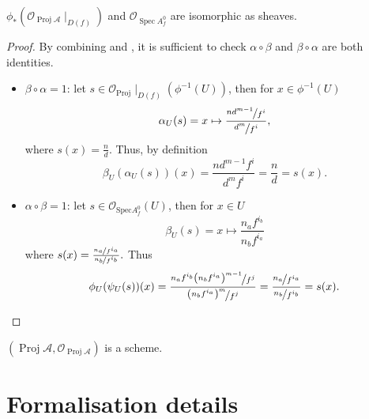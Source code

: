 \documentclass[a4paper,UKenglish,cleveref, autoref, thm-restate]{lipics-v2021}
\begin{document}
\begin{theorem}\label{thm:iso-sheaf}
    $\phi_*(\mathcal{O}_{\operatorname{Proj}\mathcal{A}}\!\mid_{D(f)})$ and $\mathcal{O}_{\operatorname{Spec}A^0_f}$ are isomorphic as sheaves.
\end{theorem}
\begin{proof}
    By combining  and , it is sufficient to check $\alpha \circ \beta$ and $\beta \circ \alpha$ are both identities. 
    \begin{itemize}
        \item $\beta\circ\alpha=1$: let $s\in\mathcal O_{\mathrm{Proj}}\!\mid_{D(f)}(\phi^{-1}(U))$, then for $x\in \phi^{-1}(U)$
        $$
        \alpha_U(s)=x\mapsto \frac{\nicefrac{nd^{m-1}}{f^i}}{\nicefrac{d^m}{f^i}},
        $$
        where $s(x)=\frac n d$.
        Thus, by definition
        $$
        \beta_U(\alpha_U(s))(x)=\frac{nd^{m-1}f^i}{d^mf^i}=\frac n d=s(x).
        $$
        \item $\alpha\circ\beta=1$: let $s\in\mathcal O_{\mathrm{Spec}A^0_f}(U)$, then for $x\in U$
        $$
        \beta_U(s)=x\mapsto \frac{n_af^{i_b}}{n_bf^{i_a}}
        $$
        where 
        $s(x)=\frac{\nicefrac{n_a}{f^{i_a}}}{\nicefrac{n_b}{f^{i_b}}}.$ Thus
        $$
        \phi_U(\psi_U(s))(x)=\frac{\nicefrac{n_af^{i_b}\left(n_bf^{i_a}\right)^{m-1}}{f^{j}}}{\nicefrac{\left(n_bf^{i_a}\right)^m}{f^{j}}}=\frac{\nicefrac{n_a}{f^{i_a}}}{\nicefrac{n_b}{f^{i_b}}}=s(x).
        $$
    \end{itemize}
\end{proof}

\begin{corollary}\label{thm:proj-scheme}
    $(\operatorname{Proj}\mathcal{A}, \mathcal{O}_{\operatorname{Proj}\mathcal{A}})$ is a scheme.
\end{corollary}

\section{Formalisation details}\label{sec:formalisation}
\end{document}

